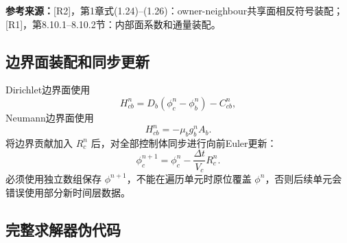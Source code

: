 \documentclass[UTF8,12pt,a4paper]{ctexart}
\numberwithin{equation}{section}
\newcommand{\Rone}{\textnormal{[R1]}}
\newcommand{\Rtwo}{\textnormal{[R2]}}
\newcommand{\source}[1]{%
  \par\smallskip
  \noindent\colorbox{sourcebg}{%
    \parbox{0.955\linewidth}{\raggedright\footnotesize\color{sourcegray}\textbf{参考来源：}#1}%
  }
  \par\smallskip
}
\begin{document}
\source{\Rtwo，第1章式(1.24)--(1.26)：owner-neighbour共享面相反符号装配；\Rone，第8.10.1--8.10.2节：内部面系数和通量装配。}

\subsection{边界面装配和同步更新}

Dirichlet边界面使用
\begin{equation}
  H_{cb}^n=D_b(\phi_c^n-\phi_b^n)
  -C_{cb}^n,
  \label{eq:algorithm_dirichlet}
\end{equation}
Neumann边界面使用
\begin{equation}
  H_{cb}^n=-\mu_bg_b^nA_b.
  \label{eq:algorithm_neumann}
\end{equation}
将边界贡献加入 $R_c^n$ 后，对全部控制体同步进行向前Euler更新：
\begin{equation}
  \boxed{
  \phi_c^{n+1}
  =\phi_c^n-\frac{\Delta t}{V_c}R_c^n}.
  \label{eq:algorithm_update}
\end{equation}
必须使用独立数组保存 $\phi^{n+1}$，不能在遍历单元时原位覆盖 $\phi^n$，否则后续单元会错误使用部分新时间层数据。

\subsection{完整求解器伪代码}
\end{document}
